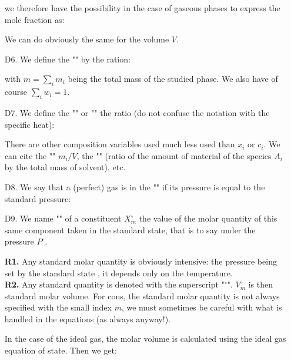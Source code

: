 \begin{enumerate}
		we therefore have the possibility in the case of gaseous phases to express the mole fraction as:
		
		\begin{tcolorbox}[title=Remark,colframe=black,arc=10pt]
		We can do obviously the same for the volume $V$.
		\end{tcolorbox}	
		
		\item[D6.] We define the "" by the ration:
		
		with $m=\sum_i m_i$ being the total mass of the studied phase. We also have of course $\sum_i w_i=1$.
		
		\item[D7.] We define the "" or "" the ratio (do not confuse the notation with the specific heat):
		
		\begin{tcolorbox}[title=Remark,colframe=black,arc=10pt]
		There are other composition variables used much less used than $x_i$ or $c_i$. We can cite the "" $m_i/V$, the "" (ratio of the amount of material of the species $A_i$ by the total mass of solvent), etc.
		\end{tcolorbox}
		
		\item[D8.] We say that a (perfect) gas is in the "" if its pressure is equal to the standard pressure:
		
		
		\item[D9.] We name "" of a constituent $X_m^\circ$ the value of the molar quantity of this same component taken in the standard state, that is to say under the pressure $P^\circ$.
		\begin{tcolorbox}[title=Remarks,colframe=black,arc=10pt]
		\textbf{R1.} Any standard molar quantity is obviously intensive: the pressure being set by the standard state , it depends only on the temperature.\\
		
		\textbf{R2.} Any standard quantity is denoted with the superscript "${}^\circ$". $V_m^\circ$ is then standard molar volume. For cons, the standard molar quantity is not always specified with the small index $m$, we must sometimes be careful with what is handled in the equations (as always anyway!).
		\end{tcolorbox}	
		In the case of the ideal gas, the molar volume is calculated using the ideal gas equation of state. Then we get:
		

\end{enumerate}
